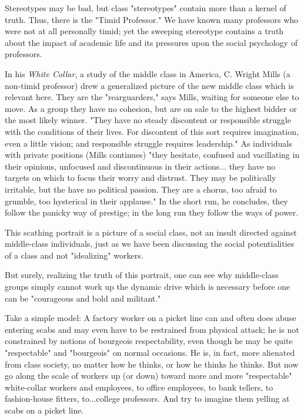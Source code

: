 Stereotypes may be bad, but class "stereotypes" contain more than a kernel of truth. Thus, there is the "Timid Professor." We have known many professors who were not at all personally timid; yet the sweeping stereotype contains a truth about the impact of academic life and its pressures upon the social psychology of professors.

In his \emph{White Collar}, a study of the middle class in America, C. Wright Mills (a non-timid professor) drew a generalized picture of the new middle class which is relevant here. They are the "rearguarders," says Mills, waiting for someone else to move. As a group they have no cohesion, but are on sale to the highest bidder or the most likely winner. "They have no steady discontent or responsible struggle with the conditions of their lives. For discontent of this sort requires imagination, even a little vision; and responsible struggle requires leadership." As individuals with private positions (Mills continues) "they hesitate, confused and vacillating in their opinions, unfocused and discontinuous in their actions... they have no targets on which to focus their worry and distrust. They may be politically irritable, but the have no political passion. They are a chorus, too afraid to grumble, too hysterical in their applause." In the short run, he concludes, they follow the panicky way of prestige; in the long run they follow the ways of power.

This scathing portrait is a picture of a social class, not an insult directed against middle-class individuals, just as we have been discussing the social potentialities of a class and not "idealizing" workers.

But surely, realizing the truth of this portrait, one can see why middle-class groups simply cannot work up the dynamic drive which is necessary before one can be "courageous and bold and militant."

Take a simple model: A factory worker on a picket line can and often does abuse entering scabs and may even have to be restrained from physical attack; he is not constrained by notions of bourgeois respectability, even though he may be quite "respectable" and "bourgeois" on normal occasions. He is, in fact, more alienated from class society, no matter how he thinks, or how he thinks he thinks. But now go along the scale of workers up (or down) toward more and more "respectable" white-collar workers and employees, to office employees, to bank tellers, to fashion-house fitters, to...college professors. And try to imagine them yelling at scabs on a picket line.

